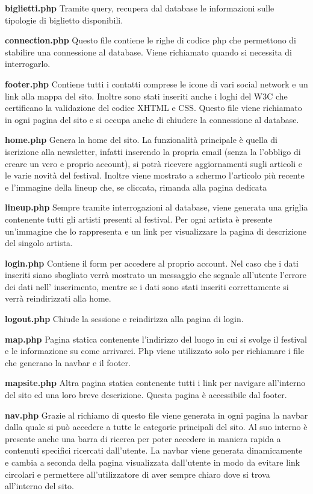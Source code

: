 \documentclass[10pt, a4paper]{article}
\begin{document}
\textbf{biglietti.php}
Tramite query, recupera dal database le informazioni sulle tipologie di biglietto disponibili.

\textbf{connection.php}
Questo file contiene le righe di codice php che permettono di stabilire una connessione al database.
Viene richiamato quando si necessita di interrogarlo.

\textbf{footer.php}
Contiene tutti i contatti comprese le icone di vari social network e un link alla mappa del sito.
Inoltre sono stati inseriti anche i loghi del W3C che certificano la validazione del codice XHTML e CSS.
Questo file viene richiamato in ogni pagina del sito e si occupa anche di chiudere la connessione al database.


\textbf{home.php}
Genera la home del sito. La funzionalità principale è quella di iscrizione alla newsletter, infatti inserendo la propria email (senza la l’obbligo di creare un vero e proprio account), si potrà ricevere aggiornamenti sugli articoli e le varie novità del festival.
Inoltre viene mostrato a schermo l’articolo più recente e l’immagine della lineup che, se cliccata, rimanda alla pagina dedicata

\textbf{lineup.php}
Sempre tramite interrogazioni al database, viene generata una griglia contenente tutti gli artisti presenti al festival. Per ogni artista è presente un’immagine che lo rappresenta e un link per visualizzare la pagina di descrizione del singolo artista.
 
\textbf{login.php}
Contiene il form per accedere al proprio account. Nel caso che i dati inseriti siano sbagliato verrà mostrato un messaggio che segnale all’utente l’errore dei dati nell’ inserimento, mentre se i dati sono stati inseriti correttamente si verrà reindirizzati alla home.

\textbf{logout.php}
Chiude la sessione e reindirizza alla pagina di login.

\textbf{map.php}
Pagina statica contenente l’indirizzo del luogo in cui si svolge il festival e le informazione su come arrivarci. Php viene utilizzato solo per richiamare i file che generano la navbar e il footer.

\textbf{mapsite.php}
Altra pagina statica contenente tutti i link per navigare all’interno del sito ed una loro breve descrizione. Questa pagina è accessibile dal footer.

\textbf{nav.php}
Grazie al richiamo di questo file viene generata in ogni pagina la navbar dalla quale si può accedere a tutte le categorie principali del sito.
Al suo interno è presente anche una barra di ricerca per poter accedere in maniera rapida a contenuti specifici ricercati dall’utente.
La navbar viene generata dinamicamente e cambia a seconda della pagina visualizzata dall’utente in modo da evitare link circolari e permettere all’utilizzatore di aver sempre chiaro dove si trova all’interno del sito.
\end{document}
